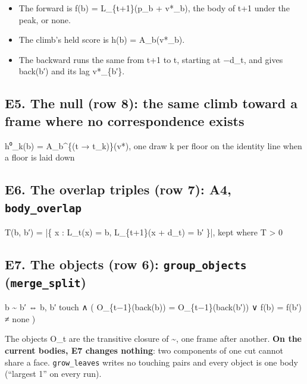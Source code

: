 \begin{itemize}
\item The forward is f(b) = L\_\allowbreak{}\{t+1\}(p\_\allowbreak{}b + v*\_\allowbreak{}b), the body of t+1 under the peak, or none.
\item The climb's held score is h(b) = A\_\allowbreak{}b(v*\_\allowbreak{}b).
\item The backward runs the same from t+1 to t, starting at −d\_\allowbreak{}t, and gives back(b′) and its lag v*\_\allowbreak{}\{b′\}.
\end{itemize}

\subsection{\texorpdfstring{E5. The null (row 8): the same climb toward a frame where no correspondence exists}{E5. The null (row 8): the same climb toward a frame where no correspondence exists}}

h⁰\_\allowbreak{}k(b) = A\_\allowbreak{}b\textasciicircum{}\{(t → t\_\allowbreak{}k)\}(v*),  one draw k per floor on the identity line when a floor is laid down

\subsection{\texorpdfstring{E6. The overlap triples (row 7): A4, \texttt{body\_\allowbreak{}overlap}}{E6. The overlap triples (row 7): A4, body\_overlap}}

T(b, b′) = |\{ x : L\_\allowbreak{}t(x) = b, L\_\allowbreak{}\{t+1\}(x + d\_\allowbreak{}t) = b′ \}|,  kept where T > 0

\subsection{\texorpdfstring{E7. The objects (row 6): \texttt{group\_\allowbreak{}objects} (\texttt{merge\_\allowbreak{}split})}{E7. The objects (row 6): group\_objects (merge\_split)}}

b \textasciitilde{} b′ ⇔ b, b′ touch ∧ ( O\_\allowbreak{}\{t−1\}(back(b)) = O\_\allowbreak{}\{t−1\}(back(b′)) ∨ f(b) = f(b′) ≠ none )

The objects O\_\allowbreak{}t are the transitive closure of \textasciitilde{}, one frame after another. \textbf{On the current bodies, E7 changes nothing}: two components of one cut cannot share a face. \texttt{grow\_\allowbreak{}leaves} writes no touching pairs and every object is one body (“largest 1” on every run).

